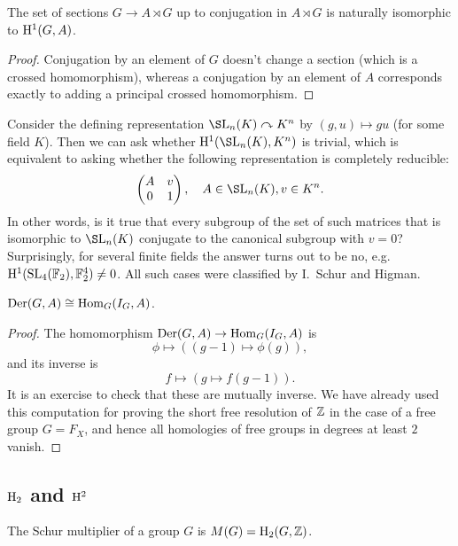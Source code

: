 \begin{cor}
    The set of sections $G\to A\rtimes G$ up to conjugation in $A\rtimes G$ is naturally isomorphic to $\mathrm{H}^1(G,A)$.
\end{cor}
\begin{proof}
    Conjugation by an element of $G$ doesn't change a section (which is a crossed homomorphism), whereas a conjugation by an element of $A$ corresponds exactly to adding a principal crossed homomorphism.
\end{proof}

\begin{example}
    Consider the defining representation $\S\rmL_n(K)\acts K^n$ by $(g,u)\mapsto gu$ (for some field $K$). Then we can ask whether $\rmH^1(\S\rmL_n(K),K^n)$ is trivial, which is equivalent to asking whether the following representation is completely reducible:
    \[\begin{pmatrix}
        A&v\\
        0&1
    \end{pmatrix},\quad A\in \S\rmL_n(K),v\in K^n.\]
    In other words, is it true that every subgroup of the set of such matrices that is isomorphic to $\S\rmL_n(K)$ conjugate to the canonical subgroup with $v=0$? Surprisingly, for several finite fields the answer turns out to be no, e.g.~$\mathrm{H}^1(\operatorname{SL}_4(\mathbb{F}_2),\mathbb{F}_2^4)\neq 0$. All such cases were classified by I.~Schur and Higman.
\end{example}

\begin{defn}
    $\operatorname{Der}(G,A)\cong \operatorname{Hom}_G(I_G,A)$.
\end{defn}
\begin{proof}
    The homomorphism $\operatorname{Der}(G,A)\to \operatorname{Hom}_G(I_G,A)$ is
    \[\phi\mapsto ((g-1)\mapsto \phi(g)),\]
    and its inverse is
    \[f\mapsto (g\mapsto f(g-1)).\]
    It is an exercise to check that these are mutually inverse. We have already used this computation for proving the short free resolution of $\mathbb{Z}$ in the case of a free group $G=F_X$, and hence all homologies of free groups in degrees at least $2$ vanish.
\end{proof}

\subsection{\texorpdfstring{$\mathrm{H}_2$}{H2} and \texorpdfstring{$\mathrm{H}^2$}{H2}}


\begin{defn}
    The Schur multiplier of a group $G$ is $M(G)=\mathrm{H}_2(G,\mathbb{Z})$.
\end{defn}

